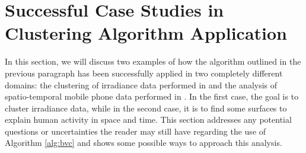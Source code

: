 \section{Successful Case Studies in Clustering Algorithm Application}
\label{sec:bcv-cases}
In this section, we will discuss two examples of how the algorithm outlined in the previous paragraph has been successfully applied in two completely different domains: the clustering of irradiance data performed in \citeauthor{secchi_bagging_2013} \citeyear{secchi_bagging_2013} and the analysis of spatio-temporal mobile phone data performed in \citeauthor{secchi_analysis_2015} \citeyear{secchi_analysis_2015}. In the first case, the goal is to cluster irradiance data, while in the second case, it is to find some surfaces to explain human activity in space and time. This section addresses any potential questions or uncertainties the reader may still have regarding the use of Algorithm \ref{alg:bvc} and shows some possible ways to approach this analysis.
